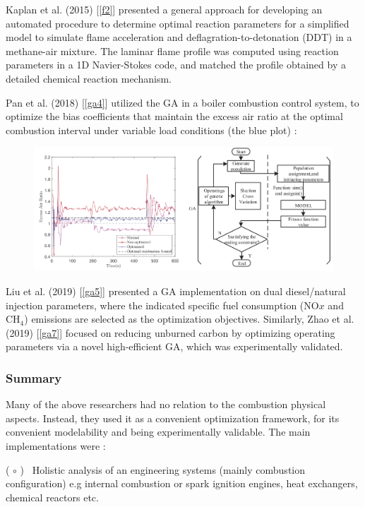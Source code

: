 \documentclass[12pt]{article}
\numberwithin{equation}{section}
\begin{document}
\begin{flushleft}
Kaplan et al. (2015) [\ref{f2}] presented a general approach for developing an automated procedure to determine optimal reaction parameters for a simplified model to simulate flame acceleration and deflagration-to-detonation (DDT) in a methane-air mixture. The laminar flame profile was computed using reaction parameters in a 1D Navier-Stokes code, and matched the profile obtained by a detailed chemical reaction mechanism. 

Pan et al. (2018) [\ref{ga4}] utilized the GA in a boiler combustion control system, to optimize the bias coefficients that maintain the excess air ratio at the optimal combustion interval under variable load conditions (the blue plot) :
\begin{figure}[H]
\centering
\includegraphics[width=1.04\linewidth, center]{GA_1.png}
\end{figure}

Liu et al. (2019) [\ref{ga5}] presented a GA implementation on dual diesel/natural injection parameters, where the indicated specific fuel consumption (NO$x$ and CH$_4$) emissions are selected as the optimization objectives. Similarly, Zhao et al. (2019) [\ref{ga7}] focused on reducing unburned carbon by optimizing operating parameters via a novel high-efficient GA, which was experimentally validated.

\subsubsection*{Summary}

Many of the above researchers had no relation to the combustion physical aspects. Instead, they used it as a convenient optimization framework, for its convenient modelability and being experimentally validable. The main implementations were :

( $ \circ $ ) \ Holistic analysis of an engineering systems (mainly combustion configuration) e.g internal combustion or spark ignition engines, heat exchangers, chemical reactors etc.


\end{flushleft}
\end{document}
